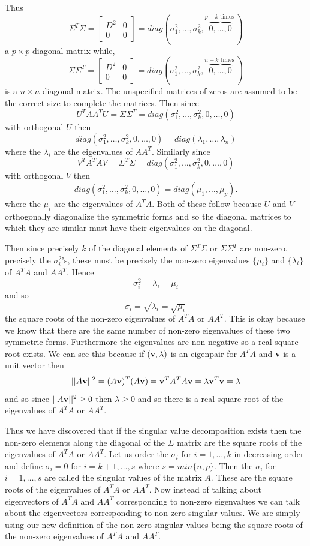 \documentclass{book}
\begin{document}
Thus
$$
\Sigma^T \Sigma=
\left[
\begin{array}{c|c}
  D^2& 0\\\hline
0& 0
\end{array}
\right]
=diag(\sigma_1^2,\ldots,\sigma_k^2,\overset{p-k\text{ times }}{\overbrace{0,\ldots,0}})
$$
a $p \times p$ diagonal matrix while, 
$$
\Sigma \Sigma^T=
\left[
\begin{array}{c|c}
D^2& 0\\\hline
0& 0
\end{array}
\right]
=diag(\sigma_1^2,\ldots,\sigma_k^2,\overset{n-k\text{ times }}{\overbrace{0,\ldots,0}})
$$
is a $n \times n$ diagonal matrix. The unspecified matrices of zeros are assumed to be the correct size to complete the matrices. Then since
$$
U^TAA^TU=\Sigma \Sigma^T=diag(\sigma_1^2,\ldots,\sigma_k^2, 0,\ldots,0)
$$ 
with orthogonal $U$ then 
$$
diag(\sigma_1^2,\ldots,\sigma_k^2, 0,\ldots,0)=diag(\lambda_1,\ldots,\lambda_n)
$$
where the $\lambda_i$ are the eigenvalues of $AA^T$. Similarly since
$$
V^TA^TAV=\Sigma^T\Sigma = diag(\sigma_1^2,\ldots,\sigma_k^2, 0,\ldots,0)
$$
with orthogonal $V$ then
$$
diag(\sigma_1^2,\ldots,\sigma_k^2, 0,\ldots,0)=diag(\mu_1,\ldots,\mu_p).
$$
where the $\mu_i$ are the eigenvalues of $A^TA$. Both of these follow because $U$ and $V$ orthogonally diagonalize the symmetric forms and so the diagonal matrices to which they are similar must have their eigenvalues on the diagonal.

Then since precisely $k$ of the diagonal elements of $\Sigma^T \Sigma$ or $\Sigma \Sigma^T$  are non-zero, precisely the $\sigma_i^2$'s, these must be precisely the non-zero eigenvalues $\{\mu_i\}$ and $\{\lambda_i\}$ of $A^TA$ and $AA^T$. Hence
$$
\sigma_i^2=\lambda_i=\mu_i
$$
and so 
$$
\sigma_i=\sqrt{\lambda_i}=\sqrt{\mu_i}
$$
the square roots of the non-zero eigenvalues of $A^TA$ or $AA^T$. This is okay because we know that there are the same number of non-zero eigenvalues of these two symmetric forms. Furthermore the eigenvalues are non-negative so a real square root exists. We can see this because if $({\bf v},\lambda)$ is an eigenpair for $A^TA$ and {\bf v} is a unit vector then
$$
||A{\bf v}||^2=(A{\bf v})^T(A{\bf v})={\bf v}^TA^TA{\bf v}=\lambda{\bf v}^T{\bf v}=\lambda
$$
and so since $||A{\bf v}||^2 \geq 0$ then $\lambda \geq 0$ and so there is a real square root of the eigenvalues of $A^TA$ or $AA^T$. 

Thus we have discovered that if the singular value decomposition exists then the non-zero elements along the diagonal of the $\Sigma$ matrix are the square roots of the eigenvalues of $A^TA$ or $AA^T$. Let us order the $\sigma_i$ for $i=1,\ldots,k$ in decreasing order and define $\sigma_i=0$ for $i=k+1,\ldots,s$ where $s=min\{n,p\}$. Then the $\sigma_i$ for $i=1,\ldots,s$ are called the singular values of the matrix $A$. These are the square roots of the eigenvalues of $A^TA$ or $AA^T$. Now instead of talking about eigenvectors of $A^TA$ and $AA^T$ corresponding to non-zero eigenvalues we can talk about the eigenvectors corresponding to non-zero singular values. We are simply using our new definition of the non-zero singular values being the square roots of the non-zero eigenvalues of $A^TA$ and $AA^T$. 
\end{document}
